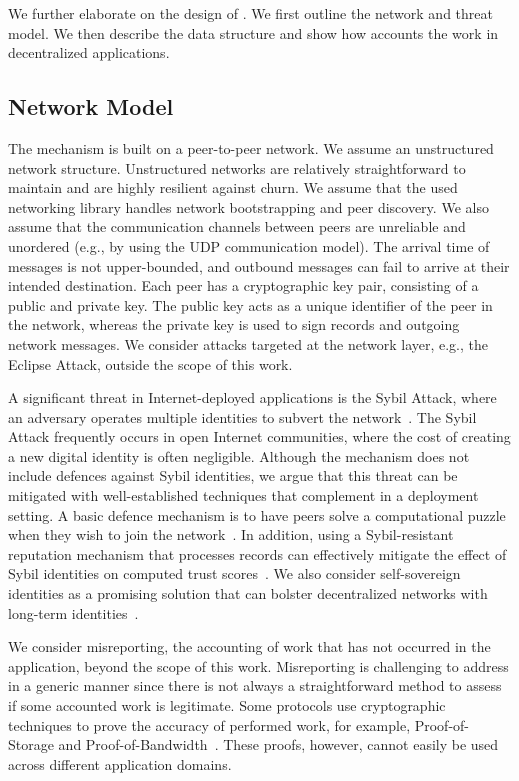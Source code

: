 We further elaborate on the design of \ModelName{}.
We first outline the network and threat model.
We then describe the \ModelName{} data structure and show how \ModelName{} accounts the work in decentralized applications.

\subsection{Network Model}
\label{sec:network_model}
The \ModelName{} mechanism is built on a peer-to-peer network.
We assume an unstructured network structure.
Unstructured networks are relatively straightforward to maintain and are highly resilient against churn.
We assume that the used networking library handles network bootstrapping and peer discovery.
We also assume that the communication channels between peers are unreliable and unordered (e.g., by using the UDP communication model).
The arrival time of messages is not upper-bounded, and outbound messages can fail to arrive at their intended destination.
Each peer has a cryptographic key pair, consisting of a public and private key.
The public key acts as a unique identifier of the peer in the network, whereas the private key is used to sign records and outgoing network messages.
We consider attacks targeted at the network layer, e.g., the Eclipse Attack, outside the scope of this work.

A significant threat in Internet-deployed applications is the Sybil Attack, where an adversary operates multiple identities to subvert the network~\cite{douceur2002sybil}.
The Sybil Attack frequently occurs in open Internet communities, where the cost of creating a new digital identity is often negligible.
Although the \ModelName{} mechanism does not include defences against Sybil identities, we argue that this threat can be mitigated with well-established techniques that complement \ModelName{} in a deployment setting.
A basic defence mechanism is to have peers solve a computational puzzle when they wish to join the network~\cite{li2012sybilcontrol}.
In addition, using a Sybil-resistant reputation mechanism that processes \ModelName{} records can effectively mitigate the effect of Sybil identities on computed trust scores~\cite{delaviz2012sybilres,yu2008sybillimit}.
We also consider self-sovereign identities as a promising solution that can bolster decentralized networks with long-term identities~\cite{stokkink2018deployment}.

We consider misreporting, the accounting of work that has not occurred in the application, beyond the scope of this work.
Misreporting is challenging to address in a generic manner since there is not always a straightforward method to assess if some accounted work is legitimate.
Some protocols use cryptographic techniques to prove the accuracy of performed work, for example, Proof-of-Storage and Proof-of-Bandwidth~\cite{benet2018filecoin,ghosh2014torpath}.
These proofs, however, cannot easily be used across different application domains.

